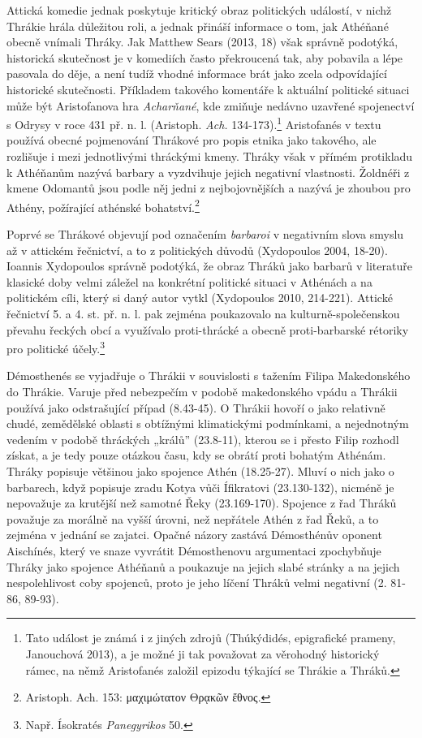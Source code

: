 Attická komedie jednak poskytuje kritický obraz politických událostí, v nichž Thrákie hrála důležitou roli, a jednak přináší informace o tom, jak Athéňané obecně vnímali Thráky. Jak Matthew Sears (2013, 18) však správně podotýká, historická skutečnost je v komediích často překroucená tak, aby pobavila a lépe pasovala do děje, a není tudíž vhodné informace brát jako zcela odpovídající historické skutečnosti. Příkladem takového komentáře k aktuální politické situaci může být Aristofanova hra {\em Acharňané}, kde zmiňuje nedávno uzavřené spojenectví s Odrysy v roce 431 př. n. l. (Aristoph. {\em Ach.} 134-173).\footnote{Tato událost je známá i z jiných zdrojů (Thúkýdidés, epigrafické prameny, Janouchová 2013), a je možné ji tak považovat za věrohodný historický rámec, na němž Aristofanés založil epizodu týkající se Thrákie a Thráků.} Aristofanés v textu používá obecné pojmenování Thrákové pro popis etnika jako takového, ale rozlišuje i mezi jednotlivými thráckými kmeny. Thráky však v přímém protikladu k Athéňanům nazývá barbary a vyzdvihuje jejich negativní vlastnosti. Žoldnéři z kmene Odomantů jsou podle něj jedni z nejbojovnějších a nazývá je zhoubou pro Athény, požírající athénské bohatství.\footnote{Aristoph. Ach. 153: μαχιμώτατον Θρᾳκῶν ἔθνος.}

Poprvé se Thrákové objevují pod označením {\em barbaroi} v negativním slova smyslu až v attickém řečnictví, a to z politických důvodů (Xydopoulos 2004, 18-20). Ioannis Xydopoulos správně podotýká, že obraz Thráků jako barbarů v literatuře klasické doby velmi záležel na konkrétní politické situaci v Athénách a na politickém cíli, který si daný autor vytkl (Xydopoulos 2010, 214-221). Attické řečnictví 5. a 4. st. př. n. l. pak zejména poukazovalo na kulturně-společenskou převahu řeckých obcí a využívalo proti-thrácké a obecně proti-barbarské rétoriky pro politické účely.\footnote{Např. Ísokratés {\em Panegyrikos} 50.}

Démosthenés se vyjadřuje o Thrákii v souvislosti s tažením Filipa Makedonského do Thrákie. Varuje před nebezpečím v podobě makedonského vpádu a Thrákii používá jako odstrašující případ (8.43-45). O Thrákii hovoří o jako relativně chudé, zemědělské oblasti s obtížnými klimatickými podmínkami, a nejednotným vedením v podobě thráckých „králů” (23.8-11), kterou se i přesto Filip rozhodl získat, a je tedy pouze otázkou času, kdy se obrátí proti bohatým Athénám. Thráky popisuje většinou jako spojence Athén (18.25-27). Mluví o nich jako o barbarech, když popisuje zradu Kotya vůči Ífikratovi (23.130-132), nicméně je nepovažuje za krutější než samotné Řeky (23.169-170). Spojence z řad Thráků považuje za morálně na vyšší úrovni, než nepřátele Athén z řad Řeků, a to zejména v jednání se zajatci. Opačné názory zastává Démosthénův oponent Aischínés, který ve snaze vyvrátit Démosthenovu argumentaci zpochybňuje Thráky jako spojence Athéňanů a poukazuje na jejich slabé stránky a na jejich nespolehlivost coby spojenců, proto je jeho líčení Thráků velmi negativní (2. 81-86, 89-93).


